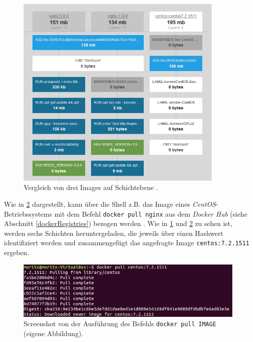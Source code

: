 \documentclass[../main.tex]{subfiles}
\begin{document}
			\begin{figure}[!htbp]
          \centering
          \includegraphics[width=0.9\textwidth]{./images/intro_imagelayers.jpg}
          \caption{Vergleich von drei Images auf Schichtebene \cite{dockerImagelayers}.}
          \label{fig:intro_imagelayers}
      \end{figure}


      Wie in \fig \ref{fig:intro_dockerPull} dargestellt, kann über die \gls{Shell} z.B. das Image eines \emph{CentOS}-Betriebssystems mit dem Befehl \texttt{docker pull nginx} aus dem \emph{Docker Hub} (siehe Abschnitt \ref{dockerRegistries}) bezogen werden \cite{dockerHubNginx}\cite{dockerPull}. Wie in \fig \ref{fig:intro_imagelayers} und \fig \ref{fig:intro_dockerPull} zu sehen ist, werden sechs Schichten heruntergeladen, die jeweils über einen Hashwert identifiziert werden und zusammengefügt das angefragte Image \texttt{centos:7.2.1511} ergeben.

			\begin{figure}[!htbp]
          \centering
          \includegraphics[width=1.0\textwidth]{./images/intro_dockerPull.jpg}
          \caption{Screenshot von der Ausführung des Befehls \texttt{docker pull IMAGE} (eigene Abbildung).}
          \label{fig:intro_dockerPull}
      \end{figure}
\end{document}

